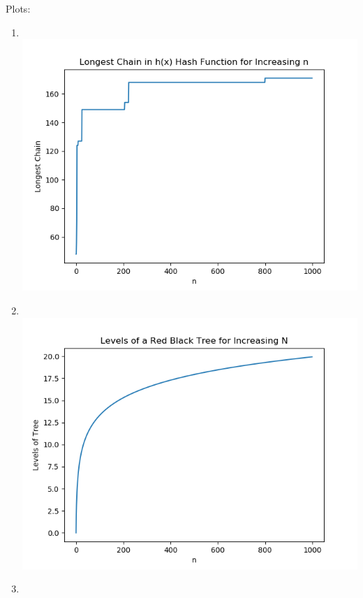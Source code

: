 \documentclass[12pt]{article}
\begin{document}
\begin{enumerate}
\begin{enumerate}
        Plots:\\
        \begin{enumerate}
            \item 
            \\
            \includegraphics[width=6in]{PS4FIG2.png}\newline
            \\
            \item
            \\
            \includegraphics[width=6in]{PS4FIG3.png}\newline
            \\
            \item
            \\

\end{enumerate}
\end{enumerate}
\end{enumerate}
\end{document}
